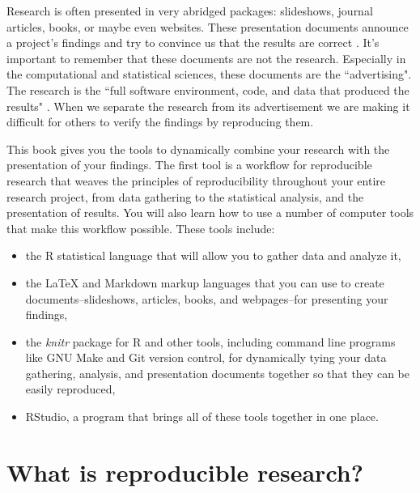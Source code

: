\documentclass[krantz1]{krantz}
\begin{document}
Research is often presented in very abridged packages: slideshows, journal articles, books, or maybe even websites. These presentation documents announce a project's findings and try to convince us that the results are correct \cite[]{Mesirov2010}. It's important to remember that these documents are not the research. Especially in the computational and statistical sciences, these documents are the ``advertising". The research is the ``full software environment, code, and data that produced the results" \cite[385]{Buckheit1995,Donohue2010}. When we separate the research from its advertisement we are making it difficult for others to verify the findings by reproducing them. 

This book gives you the tools to dynamically combine your research with the presentation of your findings. The first tool is a workflow for reproducible research that weaves the principles of reproducibility throughout your entire research project, from data gathering to the statistical analysis, and the presentation of results. You will also learn how to use a number of computer tools that make this workflow possible. These tools include:

\begin{itemize}
    \item the R statistical language that will allow you to gather data and analyze it,
    \item the LaTeX and Markdown markup languages that you can use to create documents--slideshows, articles, books, and webpages--for presenting your findings,
    \item the {\emph{knitr}} package for R and other tools, including command line programs like GNU Make and Git version control, for dynamically tying your data gathering, analysis, and presentation documents together so that they can be easily reproduced,
    \item RStudio, a program that brings all of these tools together in one place.
\end{itemize}


\section{What is reproducible research?}
\end{document}
